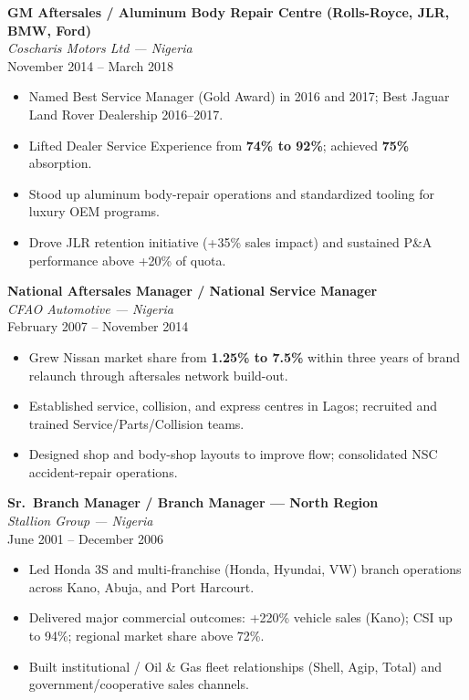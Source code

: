 \documentclass[11pt,letterpaper]{article}
\newcommand{\role}[3]{%
  \textbf{\color{accent}#1}\\[-0.1em]
  \textit{#2}\\[-0.15em]
  {#3}\par\vspace{0.25em}
}
\begin{document}
\vspace{0.4em}
\role
  {GM Aftersales / Aluminum Body Repair Centre (Rolls-Royce, JLR, BMW, Ford)}
  {Coscharis Motors Ltd --- Nigeria}
  {November 2014 -- March 2018}

\begin{itemize}
  \item Named Best Service Manager (Gold Award) in 2016 and 2017; Best Jaguar Land Rover Dealership 2016--2017.
  \item Lifted Dealer Service Experience from \textbf{74\% to 92\%}; achieved \textbf{75\%} absorption.
  \item Stood up aluminum body-repair operations and standardized tooling for luxury OEM programs.
  \item Drove JLR retention initiative (+35\% sales impact) and sustained P\&A performance above +20\% of quota.
\end{itemize}

\vspace{0.4em}
\role
  {National Aftersales Manager / National Service Manager}
  {CFAO Automotive --- Nigeria}
  {February 2007 -- November 2014}

\begin{itemize}
  \item Grew Nissan market share from \textbf{1.25\% to 7.5\%} within three years of brand relaunch through aftersales network build-out.
  \item Established service, collision, and express centres in Lagos; recruited and trained Service/Parts/Collision teams.
  \item Designed shop and body-shop layouts to improve flow; consolidated NSC accident-repair operations.
\end{itemize}

\vspace{0.4em}
\role
  {Sr.\ Branch Manager / Branch Manager --- North Region}
  {Stallion Group --- Nigeria}
  {June 2001 -- December 2006}

\begin{itemize}
  \item Led Honda 3S and multi-franchise (Honda, Hyundai, VW) branch operations across Kano, Abuja, and Port Harcourt.
  \item Delivered major commercial outcomes: +220\% vehicle sales (Kano); CSI up to 94\%; regional market share above 72\%.
  \item Built institutional / Oil \& Gas fleet relationships (Shell, Agip, Total) and government/cooperative sales channels.
\end{itemize}
\end{document}
